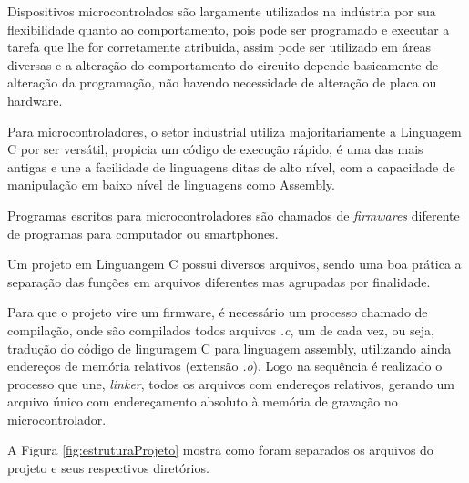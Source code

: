 Dispositivos microcontrolados são largamente utilizados na indústria 
por sua flexibilidade quanto ao comportamento, 
pois pode ser programado e executar a tarefa que 
lhe for corretamente atribuida, 
assim pode ser utilizado em áreas diversas e 
a alteração do comportamento do circuito depende basicamente de 
alteração da programação, 
não havendo necessidade de alteração de placa ou hardware. 

Para microcontroladores, 
o setor industrial utiliza majoritariamente a Linguagem C por ser versátil, 
propicia um código de execução rápido, 
é uma das mais antigas e une a facilidade de linguagens ditas de alto nível, 
com a capacidade de manipulação em baixo nível de linguagens como Assembly. 

Programas escritos para microcontroladores são chamados de 
\emph{firmwares} diferente de programas para computador ou smartphones. 

Um projeto em Linguangem C possui diversos arquivos, 
sendo uma boa prática a separação das funções em 
arquivos diferentes mas agrupadas por finalidade. 

Para que o projeto vire um firmware, 
é necessário um processo chamado de compilação, 
onde são compilados todos arquivos \emph{.c}, 
um de cada vez, ou seja, 
tradução do código de linguragem C para linguagem assembly, 
utilizando ainda endereços de memória relativos (extensão \emph{.o}). 
Logo na sequência é realizado o processo que une, \emph{linker}, 
todos os arquivos com endereços relativos, 
gerando um arquivo único com endereçamento absoluto à 
memória de gravação no microcontrolador. 

A Figura \ref{fig:estruturaProjeto} mostra como foram separados os 
arquivos do projeto e seus respectivos diretórios. 


